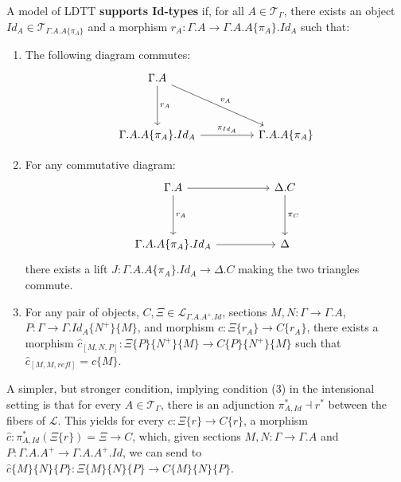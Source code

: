 \begin{defn}[Id-types]\label{idsemantic}
  A model of LDTT \textbf{supports Id-types} if, for all $A \in \mathcal{T}_{\Gamma}$, there exists an object $Id_A \in \mathcal{T}_{\Gamma.A.A\{\pi_A\}}$ and a morphism $r_A : \Gamma.A \to \Gamma.A.A\{\pi_A\}.Id_{A}$ such that:
  \begin{enumerate}
    \item The following diagram commutes:
  \[
    \ti
    \Gamma.A \ar[d, "r_A"] \ar[rd, "v_A"]\\
    \Gamma.A.A\{\pi_A\}.Id_A \ar[r, "\pi_{Id_A}"] & \Gamma.A.A\{\pi_A\}
    \kz
  \]
\item For any commutative diagram:
  \[
    \ti
    \Gamma.A \ar[d, "r_A"] \ar[r] & \Delta.C \ar[d, "\pi_C"]\\
    \Gamma.A.A\{\pi_A\}.Id_A \ar[r] & \Delta
    \kz
  \]
  there exists a lift $J: \Gamma.A.A\{\pi_A\}.Id_A \to \Delta.C$ making the two triangles commute.
\item For any pair of objects, $C, \Xi \in \mathcal{L}_{\Gamma.A.A^+.Id}$, sections $M, N : \Gamma \to \Gamma.A$, $P : \Gamma \to \Gamma.Id_A\{N^+\}\{M\}$, and morphism $c : \Xi\{r_A\} \to C\{r_A\}$, there exists a morphism $\hat c_{[M,N,P]} : \Xi\{P\}\{N^+\}\{M\} \to C\{P\}\{N^+\}\{M\}$ such that $\hat c_{[M,M,refl]} = c\{M\}$.
\end{enumerate}
\end{defn}
A simpler, but stronger condition, implying condition (3) in the intensional setting is that for every $A \in \mathcal{T}_\Gamma$, there is an adjunction $\pi_{A,Id}^* \dashv r^*$ between the fibers of $\mathcal{L}$. This yields for every $c : \Xi\{r\} \to C\{r\}$, a morphism $\hat c : \pi^*_{A,Id}(\Xi\{r\}) = \Xi \to C$, which, given sections $M, N : \Gamma \to \Gamma.A$ and $P : \Gamma.A.A^+ \to \Gamma.A.A^+.Id$, we can send to $\hat c\{M\}\{N\}\{P\} : \Xi\{M\}\{N\}\{P\} \to C\{M\}\{N\}\{P\}$.

